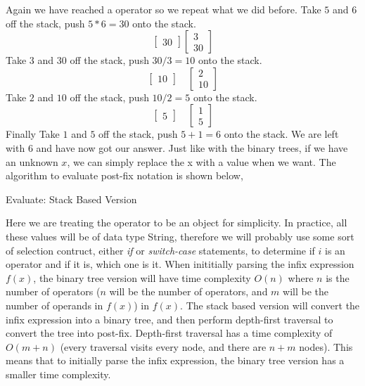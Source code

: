 \documentclass{article}
\newcounter{subsubsubsection}[subsubsection]
\begin{document}
Again we have reached a operator so we repeat what we did before. Take $5$ and $6$ off the stack, push $5*6 = 30$ onto the stack.
\[\begin{bmatrix} 30 \end{bmatrix}
\begin{bmatrix} 3 \\ 30\end{bmatrix}\]
Take $3$ and $30$ off the stack, push $30 / 3 = 10$ onto the stack.
\[\begin{bmatrix} 10 \end{bmatrix} \quad
\begin{bmatrix} 2 \\ 10 \end{bmatrix}\]
Take $2$ and $10$ off the stack, push $10/2 = 5$ onto the stack.
\[\begin{bmatrix} 5 \end{bmatrix} \quad
\begin{bmatrix} 1 \\ 5 \end{bmatrix}\]
Finally Take $1$ and $5$ off the stack, push $5 + 1 = 6$ onto the stack. We are left with 6 and have now got our answer. Just like with the binary trees, if we have an unknown $x$, we can simply replace the x with a value when we want. The algorithm to evaluate post-fix notation is shown below,\\
\begin{algorithm}[H]
\DontPrintSemicolon
\caption{Evaluate: Stack Based Version}
\end{algorithm}
Here we are treating the operator to be an object for simplicity. In practice, all these values will be of data type String, therefore we will probably use some sort of selection contruct, either \textit{if} or \textit{switch-case} statements, to determine if $i$ is an operator and if it is, which one is it.
\newpage
{}
When inititially parsing the infix expression $f(x)$, the binary tree version will have time complexity $O(n)$ where $n$ is the number of operators ($n$ will be the number of operators, and $m$ will be the number of operands in $f(x)$) in $f(x)$. The stack based version will convert the infix expression into a binary tree, and then perform depth-first traversal to convert the tree into post-fix. Depth-first traversal has a time complexity of $O(m+n)$ (every traversal visits every node, and there are $n+m$ nodes). This means that to initially parse the infix expression, the binary tree version has a smaller time complexity.\\
\end{document}
